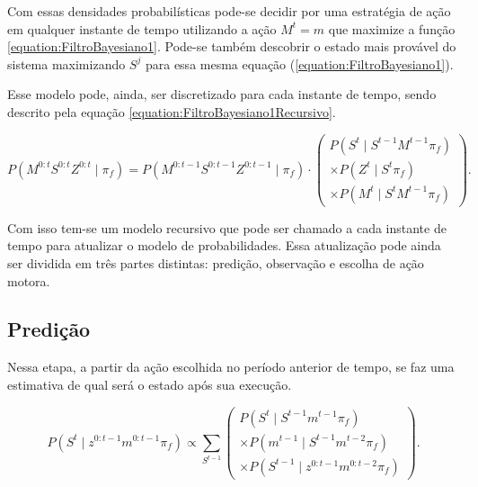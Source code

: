 Com essas densidades probabilísticas pode-se decidir por uma estratégia de ação em qualquer instante de tempo utilizando a ação $ M^t = m $ que maximize a função \ref{equation:FiltroBayesiano1}. Pode-se também descobrir o estado mais provável do sistema maximizando $ S^j $ para essa mesma equação (\ref{equation:FiltroBayesiano1}).

Esse modelo pode, ainda, ser discretizado para cada instante de tempo, sendo descrito pela equação \ref{equation:FiltroBayesiano1Recursivo}.

\begin{equation} \label{equation:FiltroBayesiano1Recursivo}
        P ( M^{0: t} S^{0: t} Z^{0: t} \mid \pi_f ) = P ( M^{0: t-1} S^{0: t-1} Z^{0: t-1} \mid \pi_f ) \cdot 
        \left(
            \begin{array}{l}
                P( S^t \mid S^{t -1} M^{t -1} \pi_f ) \\
                \times P( Z^t \mid S^t \pi_f ) \\
                \times P( M^t \mid S^t M^{t -1} \pi_f )
            \end{array}
        \right).
\end{equation}

Com isso tem-se um modelo recursivo que pode ser chamado a cada instante de tempo para atualizar o modelo de probabilidades. Essa atualização pode ainda ser dividida em três partes distintas: predição, observação e escolha de ação motora.

\subsection{Predição}

Nessa etapa, a partir da ação escolhida no período anterior de tempo, se faz uma estimativa de qual será o estado após sua execução.

\begin{equation}
    P \left( S^t \mid z^{0: t-1} m^{0: t-1} \pi_f \right) \propto \sum\limits_{S^{t-1}}
        \left(
            \begin{array}{l}
                P \left( S^t \mid S^{t-1} m^{t-1} \pi_f \right) \\
                \times P \left( m^{t-1} \mid S^{t-1} m^{t-2} \pi_f \right)\\
                \times P \left( S^{t-1} \mid z^{0: t-1} m^{0: t-2} \pi_f \right)
            \end{array}
        \right).
\end{equation}


